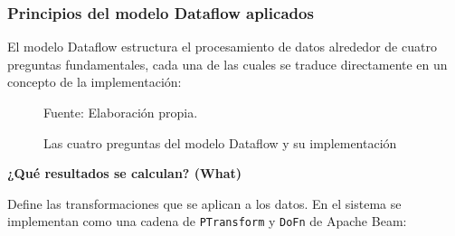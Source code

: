 \documentclass[12pt,a4paper]{article}
\renewcommand{\footnotesize}{\fontsize{10pt}{12pt}\selectfont}
\begin{document}
\subsubsection{Principios del modelo Dataflow aplicados}\label{principios-del-modelo-dataflow-aplicados}

El modelo Dataflow estructura el procesamiento de datos alrededor de cuatro preguntas fundamentales, cada una de las cuales se traduce directamente en un concepto de la implementación:

\begin{figure}[H]
    \centering
    \caption{Las cuatro preguntas del modelo Dataflow y su implementación}
    {\footnotesize Fuente: Elaboración propia.}
\end{figure}

\textbf{¿Qué resultados se calculan? (What)}

Define las transformaciones que se aplican a los datos. En el sistema se implementan como una cadena de \texttt{PTransform} y \texttt{DoFn} de Apache Beam:
\end{document}
